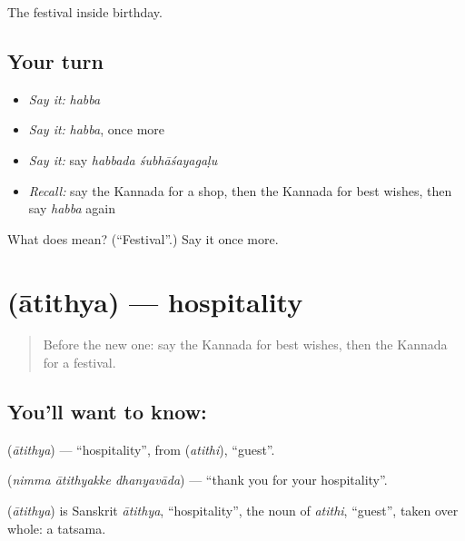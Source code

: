 \begin{grammarlens}[title={What you've built}]
The festival inside birthday.
\end{grammarlens}

\subsection*{Your turn}
\begin{itemize}
\raggedright
  \item \emph{Say it:} \emph{habba}
  \item \emph{Say it:} \emph{habba}, once more
  \item \emph{Say it:} say \emph{habbada śubhāśayagaḷu}
  \item \emph{Recall:} say the Kannada for a shop, then the Kannada for best wishes, then say \emph{habba} again
\end{itemize}

\begin{tcolorbox}[breakable,colback=teal!4,colframe=teal!35!black,title={Before you move on}]
What does  mean? (\textquotedblleft{}Festival\textquotedblright{}.) Say it once more.
\end{tcolorbox}
\section[\texorpdfstring{\kn{ಆತಿಥ್ಯ} (ātithya)}{ಆತಿಥ್ಯ (ātithya)}]{ (ātithya) — hospitality}

\label{lesson:KA-C105-hospitality}



\begin{quote}
Before the new one: say the Kannada for best wishes, then the Kannada for a festival.
\end{quote}

\subsection*{You'll want to know: }
\textbf{} (\emph{ātithya}) — \textquotedblleft{}hospitality\textquotedblright{}, from \textbf{} (\emph{atithi}), \textquotedblleft{}guest\textquotedblright{}.

\textbf{  } (\emph{nimma ātithyakke dhanyavāda}) — \textquotedblleft{}thank you for your hospitality\textquotedblright{}.

\begin{cousinweb}
\textbf{} (\emph{ātithya}) is Sanskrit \emph{ātithya}, \textquotedblleft{}hospitality\textquotedblright{}, the noun of \emph{atithi}, \textquotedblleft{}guest\textquotedblright{}, taken over whole: a tatsama.
\end{cousinweb}

